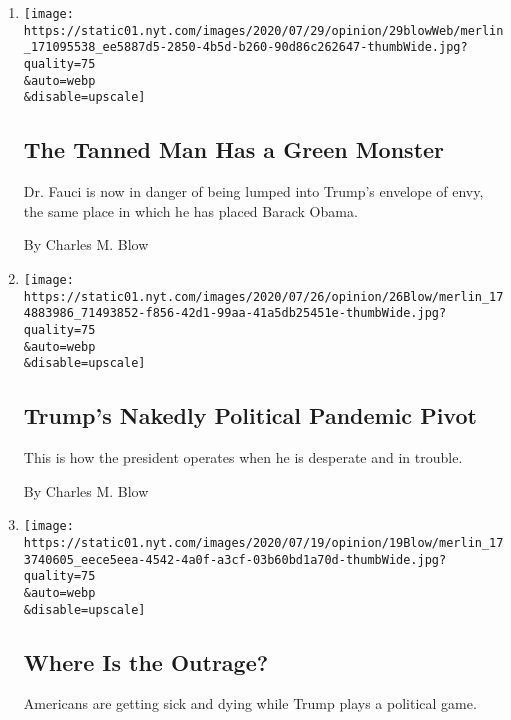 \begin{enumerate}
\def\labelenumi{\arabic{enumi}.}
\item
  \href{/2020/07/29/opinion/anthony-fauci-trump.html}{}

  \texttt{[image: https://static01.nyt.com/images/2020/07/29/opinion/29blowWeb/merlin\_171095538\_ee5887d5-2850-4b5d-b260-90d86c262647-thumbWide.jpg?quality=75\\\&auto=webp\\\&disable=upscale]}

  \hypertarget{the-tanned-man-has-a-green-monster}{%
  \subsection{The Tanned Man Has a Green
  Monster}\label{the-tanned-man-has-a-green-monster}}

  Dr. Fauci is now in danger of being lumped into Trump's envelope of
  envy, the same place in which he has placed Barack Obama.

  By Charles M. Blow
\item
  \href{/2020/07/26/opinion/trump-coronavirus-convention.html}{}

  \texttt{[image: https://static01.nyt.com/images/2020/07/26/opinion/26Blow/merlin\_174883986\_71493852-f856-42d1-99aa-41a5db25451e-thumbWide.jpg?quality=75\\\&auto=webp\\\&disable=upscale]}

  \hypertarget{trumps-nakedly-political-pandemic-pivot}{%
  \subsection{Trump's Nakedly Political Pandemic
  Pivot}\label{trumps-nakedly-political-pandemic-pivot}}

  This is how the president operates when he is desperate and in
  trouble.

  By Charles M. Blow
\item
  \href{/2020/07/19/opinion/trump-coronavirus-us.html}{}

  \texttt{[image: https://static01.nyt.com/images/2020/07/19/opinion/19Blow/merlin\_173740605\_eece5eea-4542-4a0f-a3cf-03b60bd1a70d-thumbWide.jpg?quality=75\\\&auto=webp\\\&disable=upscale]}

  \hypertarget{where-is-the-outrage}{%
  \subsection{Where Is the Outrage?}\label{where-is-the-outrage}}

  Americans are getting sick and dying while Trump plays a political
  game.


\end{enumerate}
